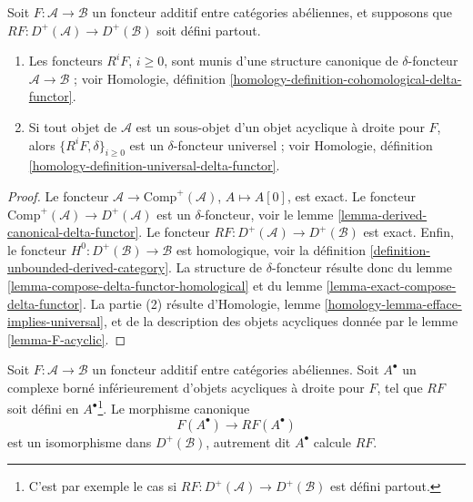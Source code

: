 \begin{lemma}
\label{lemma-right-derived-delta-functor}
Soit $F : \mathcal{A} \to \mathcal{B}$ un foncteur additif entre catégories
abéliennes, et supposons que
$RF : D^{+}(\mathcal{A}) \to D^{+}(\mathcal{B})$ soit défini partout.
\begin{enumerate}
\item Les foncteurs $R^iF$, $i \geq 0$, sont munis d'une structure canonique
de $\delta$-foncteur $\mathcal{A} \to \mathcal{B}$ ; voir Homologie,
définition \ref{homology-definition-cohomological-delta-functor}.
\item Si tout objet de $\mathcal{A}$ est un sous-objet d'un objet acyclique à
droite pour $F$, alors $\{R^iF, \delta\}_{i \geq 0}$ est un
$\delta$-foncteur universel ; voir Homologie, définition
\ref{homology-definition-universal-delta-functor}.
\end{enumerate}
\end{lemma}

\begin{proof}
Le foncteur $\mathcal{A} \to \text{Comp}^{+}(\mathcal{A})$,
$A \mapsto A[0]$, est exact. Le foncteur
$\text{Comp}^{+}(\mathcal{A}) \to D^{+}(\mathcal{A})$ est un
$\delta$-foncteur, voir le
lemme \ref{lemma-derived-canonical-delta-functor}. Le foncteur
$RF : D^{+}(\mathcal{A}) \to D^{+}(\mathcal{B})$ est exact. Enfin, le foncteur
$H^0 : D^{+}(\mathcal{B}) \to \mathcal{B}$ est homologique, voir la
définition \ref{definition-unbounded-derived-category}. La structure de
$\delta$-foncteur résulte donc du
lemme \ref{lemma-compose-delta-functor-homological} et du
lemme \ref{lemma-exact-compose-delta-functor}. La partie (2) résulte
d'Homologie, lemme \ref{homology-lemma-efface-implies-universal}, et de la
description des objets acycliques donnée par le lemme \ref{lemma-F-acyclic}.
\end{proof}

\begin{lemma}
\label{lemma-leray-acyclicity}
Soit $F : \mathcal{A} \to \mathcal{B}$ un foncteur additif entre catégories
abéliennes. Soit $A^\bullet$ un complexe borné inférieurement d'objets
acycliques à droite pour $F$, tel que $RF$ soit défini en
$A^\bullet$\footnote{C'est par exemple le cas si
$RF : D^{+}(\mathcal{A}) \to D^{+}(\mathcal{B})$ est défini partout.}.
Le morphisme canonique
$$
F(A^\bullet) \longrightarrow RF(A^\bullet)
$$
est un isomorphisme dans $D^{+}(\mathcal{B})$, autrement dit $A^\bullet$
calcule $RF$.
\end{lemma}

